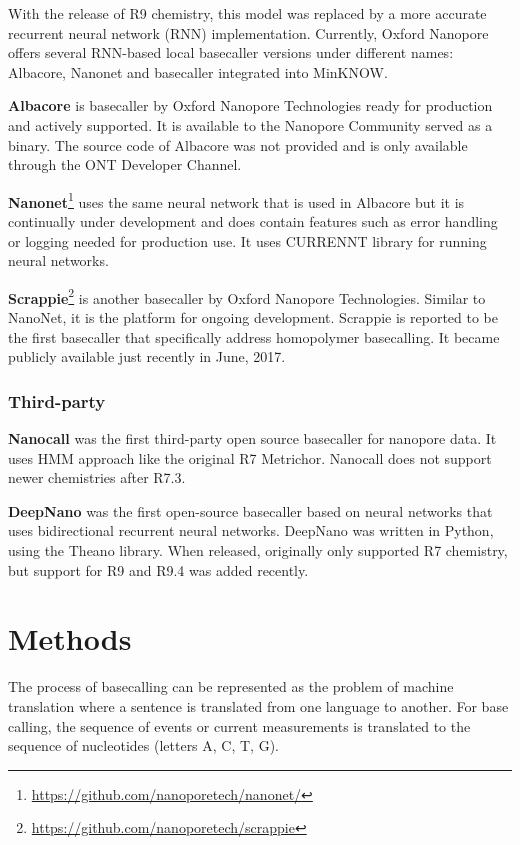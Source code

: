 \documentclass[times, utf8, diplomski, numeric, english]{fer}
\begin{document}
With the release of R9 chemistry, this model was replaced by a more accurate recurrent neural network (RNN) implementation. Currently, Oxford Nanopore offers several RNN-based local basecaller versions under different names\cite{ont-basecallers}: Albacore, Nanonet and basecaller integrated into MinKNOW.  

\textbf{Albacore} is basecaller by Oxford Nanopore Technologies ready for production and actively supported.
It is available to the Nanopore Community served as a binary. The source code of Albacore was not provided and is only available through the ONT Developer Channel. 

\textbf{Nanonet}\footnote{\url{https://github.com/nanoporetech/nanonet/}} uses the same neural network that is used in Albacore but it is continually under development and does contain features such as error handling or logging needed for production use. It uses CURRENNT library for running neural networks.


\textbf{Scrappie}\footnote{\url{https://github.com/nanoporetech/scrappie}} is another basecaller by Oxford Nanopore Technologies. Similar to NanoNet, it is the platform for ongoing development. Scrappie is reported to be the first basecaller  that specifically address homopolymer basecalling. It became publicly available just recently in June, 2017.

\subsection{Third-party}

\textbf{Nanocall}\cite{David046086} was the first third-party open source basecaller for nanopore data. It uses HMM approach like the original R7 Metrichor. Nanocall does not support newer chemistries after R7.3.


\textbf{DeepNano}\cite{Boza2017}  was the first open-source basecaller based on neural networks that uses bidirectional recurrent neural networks. DeepNano was written in Python, using the Theano library. When released, originally only supported R7 chemistry, but support for R9 and R9.4 was added recently.



\chapter{Methods}
The process of basecalling can be represented as the problem of machine translation where a sentence is translated from one language to another. For base calling, the sequence of events or current measurements is translated to the sequence of nucleotides (letters A, C, T, G).
\end{document}
